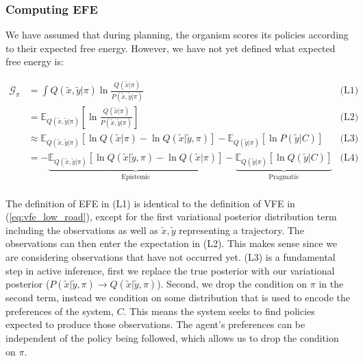 \documentclass{article}
\newcommand{\refp}[1]{(\ref{#1})}
\begin{document}
\subsubsection{Computing EFE}

We have assumed that during planning, the organism scores its policies according to their expected free energy. However, we have not yet defined what expected free energy is:

\begin{equation}\label{eq:efe}
	\begin{aligned}
		\mathcal{G}_\pi &= \int Q(\tilde{x}, \tilde{y} | \pi) \ln \frac{Q(\tilde{x} | \pi)}{P(\tilde{x}, \tilde{y} | \pi)} & \text{(L1)}\\ 
		&= \mathbb{E}_{Q(\tilde{x}, \tilde{y} | \pi)} \left[ \ln \frac{Q(\tilde{x} | \pi)}{P(\tilde{x}, \tilde{y} | \pi)} \right] & \text{(L2)} \\
		&\approx \mathbb{E}_{Q(\tilde{x}, \tilde{y} | \pi)} \left[ \ln Q(\tilde{x} | \pi) - \ln Q(\tilde{x} | \tilde{y}, \pi) \right] - \mathbb{E}_{Q(\tilde{y} | \pi)}\left[ \ln P(\tilde{y} | C) \right] & \text{(L3)}\\
		&= - \underbrace{\mathbb{E}_{Q(\tilde{x}, \tilde{y} | \pi)} \left[ \ln Q(\tilde{x} | \tilde{y}, \pi) - \ln Q(\tilde{x} | \pi) \right]}_{\text{Epistemic}} - \underbrace{\mathbb{E}_{Q(\tilde{y} | \pi)}\left[ \ln Q(\tilde{y} | C) \right]}_{\text{Pragmatic}} & \text{(L4)}\\ 
	\end{aligned}
\end{equation}


The definition of EFE in (L1) is identical to the definition of VFE in \refp{eq:vfe_low_road}, except for the first variational posterior distribution term including the observations as well as $\tilde{x}, \tilde{y}$ representing a trajectory. The observations can then enter the expectation in (L2). This makes sense since we are considering observations that have not occurred yet. (L3) is a fundamental step in active inference, first we replace the true posterior with our variational posterior ($P(\tilde{x} | \tilde{y}, \pi) \to Q(\tilde{x} | \tilde{y}, \pi)$). Second, we drop the condition on $\pi$ in the second term, instead we condition on some distribution that is used to encode the preferences of the system, $C$. This means the system seeks to find policies expected to produce those observations. The agent’s preferences can be independent of the policy being followed, which allows us to drop the condition on $\pi$. 
\end{document}
